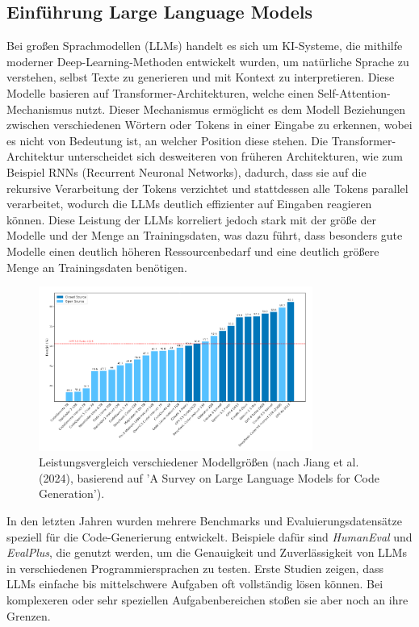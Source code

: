 \documentclass[11pt,a4paper]{article}
\begin{document}
\subsection{Einführung Large Language Models}
\label{sec:LLMs}
Bei großen Sprachmodellen (LLMs) handelt es sich um KI-Systeme, die mithilfe moderner Deep-Learning-Methoden entwickelt wurden, um natürliche Sprache zu verstehen, selbst Texte zu generieren und mit Kontext zu interpretieren\cite{naveed2024comprehensiveoverviewlargelanguage}. Diese Modelle basieren auf Transformer-Architekturen, welche einen Self-Attention-Mechanismus nutzt. Dieser Mechanismus ermöglicht es dem Modell Beziehungen zwischen verschiedenen Wörtern oder Tokens in einer Eingabe zu erkennen, wobei es nicht von Bedeutung ist, an welcher Position diese stehen. Die Transformer-Architektur unterscheidet sich desweiteren von früheren Architekturen, wie zum Beispiel RNNs (Recurrent Neuronal Networks), dadurch, dass sie auf die rekursive Verarbeitung der Tokens verzichtet und stattdessen alle Tokens parallel verarbeitet, wodurch die LLMs deutlich effizienter auf Eingaben reagieren können. Diese Leistung der LLMs korreliert jedoch stark mit der größe der Modelle und der Menge an Trainingsdaten, was dazu führt, dass besonders gute Modelle einen deutlich höheren Ressourcenbedarf und eine deutlich größere Menge an Trainingsdaten benötigen\cite{jiang2024surveylargelanguagemodels}.\\
\begin{figure}[H]
    \centering
    \includegraphics[width=0.8\textwidth]{./bilder/performance_comparison.png}
    \caption{Leistungsvergleich verschiedener Modellgrößen (nach Jiang et al. (2024), basierend auf 'A Survey on Large Language Models for Code Generation').}
    \label{fig:performance_comparison}
\end{figure}
In den letzten Jahren wurden mehrere Benchmarks und Evaluierungsdatensätze speziell für die Code-Generierung entwickelt. Beispiele dafür sind \emph{HumanEval}\cite{chen2021evaluatinglargelanguagemodels} und \emph{EvalPlus}\cite{evalplus}, die genutzt werden, um die Genauigkeit und Zuverlässigkeit von LLMs in verschiedenen Programmiersprachen zu testen. Erste Studien zeigen, dass LLMs einfache bis mittelschwere Aufgaben oft vollständig lösen können. Bei komplexeren oder sehr speziellen Aufgabenbereichen stoßen sie aber noch an ihre Grenzen\cite{NEURIPS2023_43e9d647}.
\end{document}
